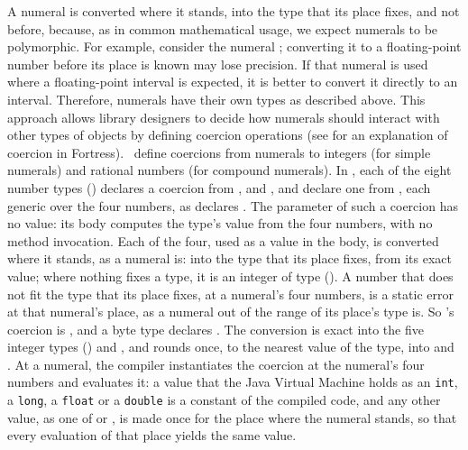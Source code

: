 A numeral is converted where it stands, into the type that its place fixes,
and not before, because, as in common mathematical usage,
we expect numerals to be polymorphic.
For example, consider the numeral ;
converting it to a floating-point number before its place is known
may lose precision.
If that numeral is used where a floating-point interval is expected,
it is better to convert it directly to an interval.
Therefore, numerals have their own types as described above.
This approach allows library designers to decide how numerals should
interact with other types of objects by defining coercion operations
(see  for an explanation of coercion
in Fortress).
\Library\ define coercions
from numerals to integers (for simple numerals)
and rational numbers (for compound numerals).
In \library, each of the eight number types () declares
a coercion from , and , 
and  declare one from , each generic
over the four numbers, as  declares
.
The parameter of such a coercion has no value: its body computes the type's
value from the four numbers, with no method invocation.
Each of the four, used as a value in the body, is converted where it stands, as
a numeral is: into the type that its place fixes, from its exact value; where
nothing fixes a type, it is an integer of type 
().
A number that does not fit the type that its place fixes, at a numeral's four
numbers, is a static error at that numeral's place, as a numeral out of the
range of its place's type is.
So 's coercion is
,
and a byte type 
declares
.
The conversion is exact into the five integer types ()
and , and rounds once, to the nearest value of the type, into
 and .
At a numeral, the compiler instantiates the coercion at the numeral's four
numbers and evaluates it: a value that the Java Virtual Machine holds as an
\texttt{int}, a \texttt{long}, a \texttt{float} or a \texttt{double} is a
constant of the compiled code, and any other value, as one of 
or , is made once for the place where the numeral stands, so
that every evaluation of that place yields the same value.

